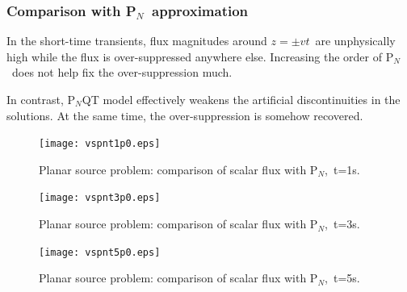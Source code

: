 \documentclass[review]{elsarticle}
\newcommand{\pn}{P$_N$}
\begin{document}
\subsubsection*{Comparison with \pn~approximation}
In the short-time transients, flux magnitudes around $z=\pm vt$~are unphysically high while the flux is over-suppressed anywhere else. Increasing the order of \pn~does not help fix the over-suppression much. 

In contrast, P$_N$QT model effectively weakens the artificial discontinuities in the solutions. At the same time, the over-suppression is somehow recovered.

\begin{figure}[ht!]
	\begin{center}
		\hspace*{-3cm}\texttt{[image: vspnt1p0.eps]}
		\caption[]{\label{pn1p0}Planar source problem: comparison of scalar flux with \pn,~t=1s.}%
	\end{center}
\end{figure}

\begin{figure}[ht!]
	\begin{center}
		\hspace*{-3cm}\texttt{[image: vspnt3p0.eps]}
		\caption[]{\label{pn3p0}Planar source problem: comparison of scalar flux with \pn,~t=3s.}%
	\end{center}
\end{figure}

\begin{figure}[ht!]
	\begin{center}
		\hspace*{-3cm}\texttt{[image: vspnt5p0.eps]}
		\caption[]{\label{pn5p0}Planar source problem: comparison of scalar flux with \pn,~t=5s.}%
	\end{center}
\end{figure}
\end{document}
